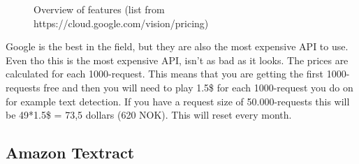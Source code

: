 \begin{figure}[h]
    \caption{Overview of features (list from https://cloud.google.com/vision/pricing)}
    \label{fig:Prices}
\end{figure}

Google is the best in the field, but they are also the most expensive API to use.
Even tho this is the most expensive API, isn't as bad as it looks.
The prices are calculated for each 1000-request.
This means that you are getting the first 1000-requests free and then you will need to play 1.5\$ for each 1000-request you do on for example text detection.
If you have a request size of 50.000-requests this will be 49*1.5\$ = 73,5 dollars (620 NOK).
This will reset every month.

\subsection{Amazon Textract}\label{subsec:API_Amazon}

